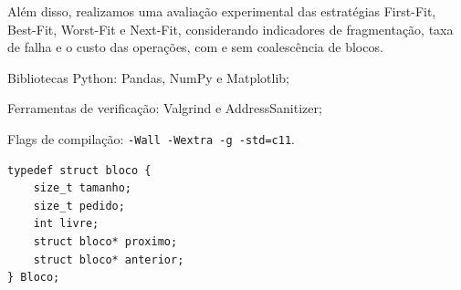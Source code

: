 %
%
%



Além disso, realizamos uma avaliação experimental das estratégias First-Fit,
Best-Fit, Worst-Fit e Next-Fit, considerando indicadores de fragmentação,
taxa de falha e o custo das operações, com e sem coalescência de blocos.

\item Bibliotecas Python: Pandas, NumPy e Matplotlib;
\item Ferramentas de verificação: Valgrind e AddressSanitizer;
\item Flags de compilação: \texttt{-Wall -Wextra -g -std=c11}.

\begin{verbatim}
typedef struct bloco {
    size_t tamanho;
    size_t pedido;
    int livre;
    struct bloco* proximo;
    struct bloco* anterior;
} Bloco;
\end{verbatim}

